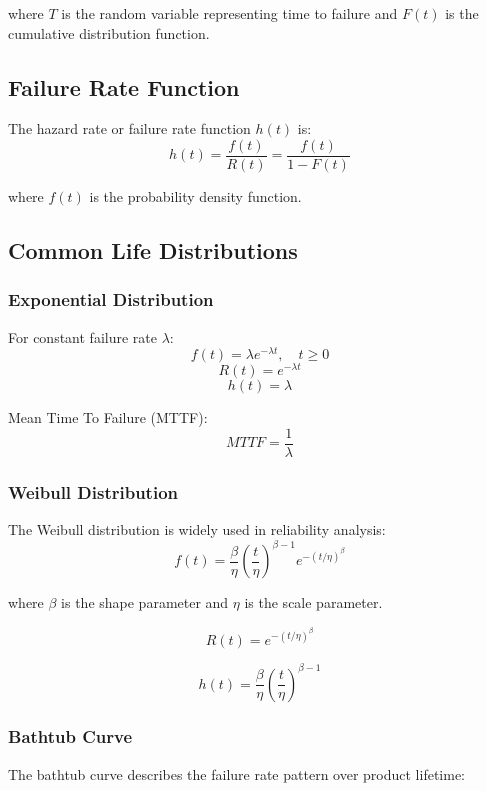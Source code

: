 \documentclass[twoside]{book}
\begin{document}
where $T$ is the random variable representing time to failure and $F(t)$ is the cumulative distribution function.

\subsection{Failure Rate Function}

The hazard rate or failure rate function $h(t)$ is:
$$h(t) = \frac{f(t)}{R(t)} = \frac{f(t)}{1-F(t)}$$

where $f(t)$ is the probability density function.

\subsection{Common Life Distributions}

\subsubsection{Exponential Distribution}

For constant failure rate $\lambda$:
$$f(t) = \lambda e^{-\lambda t}, \quad t \geq 0$$
$$R(t) = e^{-\lambda t}$$
$$h(t) = \lambda$$

Mean Time To Failure (MTTF):
$$MTTF = \frac{1}{\lambda}$$

\subsubsection{Weibull Distribution}

The Weibull distribution is widely used in reliability analysis:
$$f(t) = \frac{\beta}{\eta}\left(\frac{t}{\eta}\right)^{\beta-1} e^{-(t/\eta)^{\beta}}$$

where $\beta$ is the shape parameter and $\eta$ is the scale parameter.

$$R(t) = e^{-(t/\eta)^{\beta}}$$

$$h(t) = \frac{\beta}{\eta}\left(\frac{t}{\eta}\right)^{\beta-1}$$

\subsubsection{Bathtub Curve}

The bathtub curve describes the failure rate pattern over product lifetime:

\begin{figure}[H]
\centering
{}
\end{figure}
\end{document}
